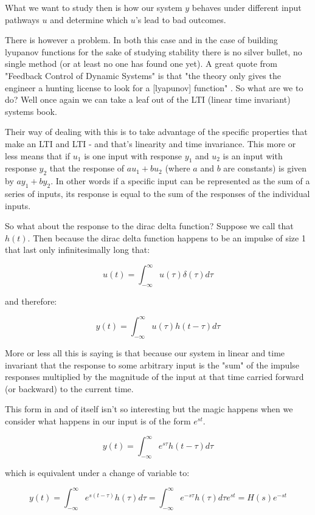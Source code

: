 \documentclass[11pt,a5paper]{article}
\begin{document}
What we want to study then is how our system $y$ behaves under different input pathways $u$ and determine which $u$'s lead to bad outcomes. \newline

There is however a problem. In both this case and in the case of building lyupanov functions for the sake of studying stability there is no silver bullet, no single method (or at least no one has found one yet). A great quote from "Feedback Control of Dynamic Systems" is that "the theory only gives the engineer a hunting license to look for a [lyapunov] function" \cite{feedback}. So what are we to do? Well once again we can take a leaf out of the LTI (linear time invariant) systems book. \newline

Their way of dealing with this is to take advantage of the specific properties that make an LTI and LTI - and that's linearity and time invariance. This more or less means that if $u_1$ is one input with response $y_1$ and $u_2$ is an input with response $y_2$ that the response of $au_1 + bu_2$ (where $a$ and $b$ are constants) is given by $ay_1 + by_2$. In other words if a specific input can be represented as the sum of a series of inputs, its response is equal to the sum of the responses of the individual inputs. 

So what about the response to the dirac delta function? Suppose we call that $h(t)$. Then because the dirac delta function happens to be an impulse of size 1 that last only infinitesimally long that:

$$u(t) = \int_{-\infty}^{\infty}u(\tau) \delta(\tau)d\tau$$

and therefore:

$$y(t) = \int_{-\infty}^{\infty}u(\tau) h(t-\tau)d\tau$$

More or less all this is saying is that because our system in linear and time invariant that the response to some arbitrary input is the "sum" of the impulse responses multiplied by the magnitude of the input at that time carried forward (or backward) to the current time. 

This form in and of itself isn't so interesting but the magic happens when we consider what happens in our input is of the form $e^{st}$.

 $$y(t) = \int_{-\infty}^{\infty}e^{s\tau} h(t-\tau)d\tau$$
 
 which is equivalent under a change of variable to:
 
 $$y(t) = \int_{-\infty}^{\infty}e^{s(t-\tau)} h(\tau)d\tau = \int_{-\infty}^{\infty}e^{-s\tau} h(\tau)d\tau e^{st}=H(s)e^{-st}$$
 
\end{document}
